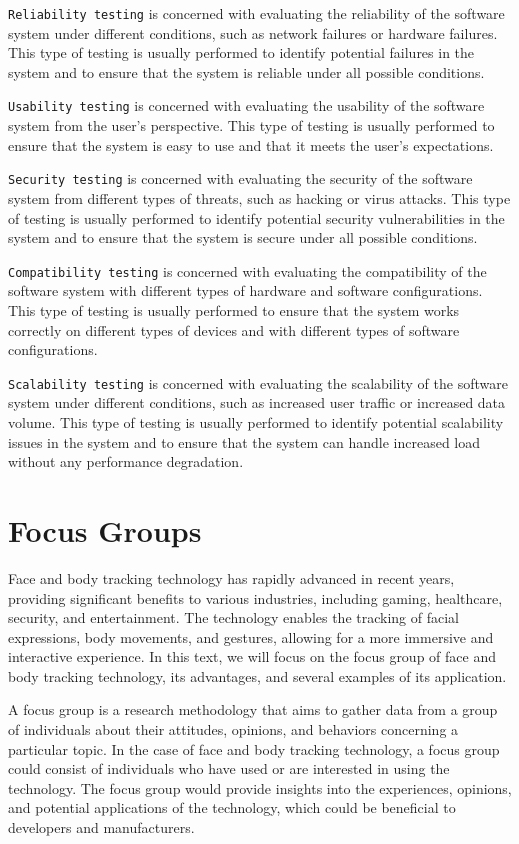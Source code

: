 \texttt{Reliability testing} is concerned with evaluating the reliability of the software system under different conditions, 
such as network failures or hardware failures. This type of testing is usually performed to identify potential failures 
in the system and to ensure that the system is reliable under all possible conditions.

\texttt{Usability testing} is concerned with evaluating the usability of the software system from the user's perspective. This 
type of testing is usually performed to ensure that the system is easy to use and that it meets the user's expectations.

\texttt{Security testing} is concerned with evaluating the security of the software system from different types of threats, such as 
hacking or virus attacks. This type of testing is usually performed to identify potential security vulnerabilities in the 
system and to ensure that the system is secure under all possible conditions.

\texttt{Compatibility testing} is concerned with evaluating the compatibility of the software system with different types of hardware 
and software configurations. This type of testing is usually performed to ensure that the system works correctly on different 
types of devices and with different types of software configurations.

\texttt{Scalability testing} is concerned with evaluating the scalability of the software system under different conditions, such as 
increased user traffic or increased data volume. This type of testing is usually performed to identify potential scalability 
issues in the system and to ensure that the system can handle increased load without any performance degradation.

\section{Focus Groups}
Face and body tracking technology has rapidly advanced in recent years, providing significant benefits to various industries, 
including gaming, healthcare, security, and entertainment. The technology enables the tracking of facial expressions, body movements, 
and gestures, allowing for a more immersive and interactive experience. In this text, we will focus on the focus group of face and body 
tracking technology, its advantages, and several examples of its application.

A focus group is a research methodology that aims to gather data from a group of individuals about their attitudes, opinions, 
and behaviors concerning a particular topic. In the case of face and body tracking technology, a focus group could consist of 
individuals who have used or are interested in using the technology. The focus group would provide insights into the experiences, 
opinions, and potential applications of the technology, which could be beneficial to developers and manufacturers.

